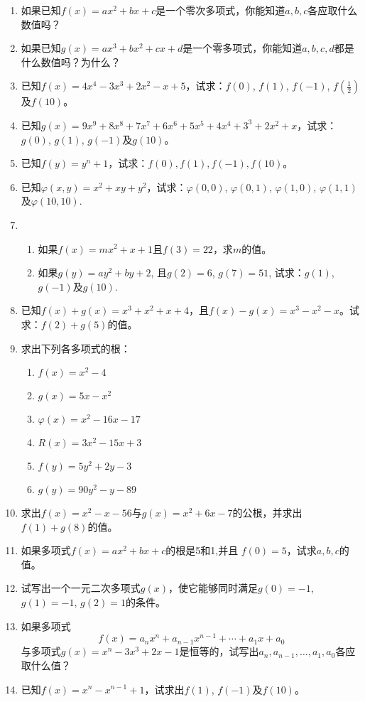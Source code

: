 \begin{enumerate}
\item 如果已知$f(x)=ax^2+bx+c$是一个零次多项式，你能知道$a,b,c$各应取什么数值吗？
\item 如果已知$g(x)=ax^3+bx^2+cx+d$是一个零多项式，你能知道$a,b,c,d$都是什么数值吗？为什么？
\item 已知$f(x)=4x^4-3x^3+2x^2-x+5$，试求：$f(0)$, $f(1)$, $f(-1)$, $f\left(\frac{1}{2}\right)$及$f(10)$。
\item 已知$g(x)=9x^9+8x^8+7x^7+6x^6+5x^5+4x^4+3^3+2x^2+x$，试求：$g(0)$, $g(1)$, $g(-1)$及$g(10)$。

\item 已知$f(y)=y^n+1$，试求：$f(0),f(1),f(-1),f(10)$。

\item 已知$\varphi(x,y)=x^2+xy+y^2$，试求：$\varphi(0, 0)$, $\varphi(0, 1)$, $\varphi(1, 0)$, $\varphi(1, 1)$及$\varphi(10, 10)$.
\item \begin{enumerate}
    \item 如果$f(x)=mx^2+x+1$且$f(3)=22$，求$m$的值。
    \item 如果$g(y)=ay^2+by+2$, 且$g(2)=6$, $g (7)=51$, 试求：$g(1)$, $g(-1)$及$g(10)$.
\end{enumerate} 

\item 已知$f(x)+g(x)=x^3+x^2+x+4$，且$f(x)-g(x)=x^3-x^2-x$。试求：$f(2)+g(5)$的值。
\item 求出下列各多项式的根：
    \begin{multicols}{2}
\begin{enumerate}
    \item $f (x) =x^2-4$
    \item $g (x) =5x-x^2$
    \item $\varphi (x) =x^2-16x-17$
    \item $R(x)=3x^2-15x+3$
    \item $f(y)=5y^2+2y-3$
    \item $g(y)=90y^2-y-89$
\end{enumerate}
 \end{multicols}

\item 求出$f(x)=x^2-x-56$与$g(x)=x^2+6x-7$的公根，并求出$f(1)+g(8)$的值。
\item 如果多项式$f(x)=ax^2+bx+c$的根是5和1,并且
$f(0)=5$，试求$a,b,c$的值。
\item 试写出一个一元二次多项式$g(x)$，使它能够同时满足$g(0)=-1$, $g(1)=-1$, $g(2)=1$的条件。
\item 如果多项式
\[f (x) =a_nx^n+a_{n-1} x^{n-1}+\cdots+a_1x+a_0\]
与多项式$g(x)=x^n-3x^3+2x-1$是恒等的，试写出$a_n,a_{n-1},\ldots,a_1,a_0$各应取什么值？
\item 已知$f(x)=x^n-x^{n-1}+1$，试求出$f(1)$, $f(-1)$及$f (10)$。

\end{enumerate}


